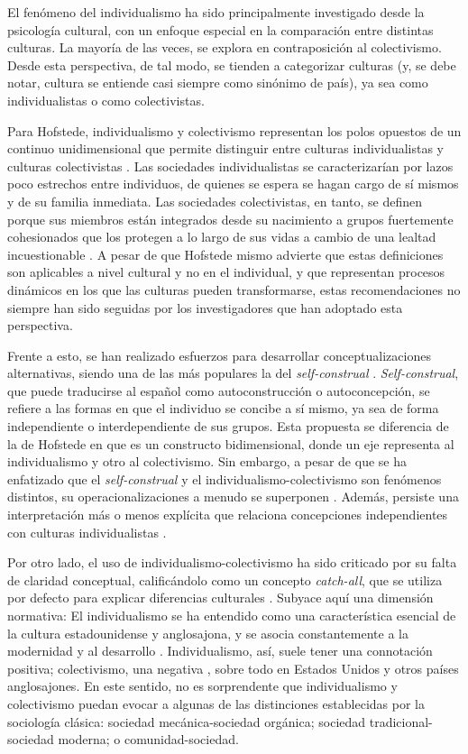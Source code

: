 \documentclass[12pt,twoside]{templates/facsothesis}
\begin{document}
El fenómeno del individualismo ha sido principalmente investigado desde la psicología cultural, con un enfoque especial en la comparación entre distintas culturas. La mayoría de las veces, se explora en contraposición al colectivismo. Desde esta perspectiva, de tal modo, se tienden a categorizar culturas (y, se debe notar, cultura se entiende casi siempre como sinónimo de país), ya sea como individualistas o como colectivistas.

Para Hofstede, individualismo y colectivismo representan los polos opuestos de un continuo unidimensional que permite distinguir entre culturas individualistas y culturas colectivistas \citep{yoon2010}. Las sociedades individualistas se caracterizarían por lazos poco estrechos entre individuos, de quienes se espera se hagan cargo de sí mismos y de su familia inmediata. Las sociedades colectivistas, en tanto, se definen porque sus miembros están integrados desde su nacimiento a grupos fuertemente cohesionados que los protegen a lo largo de sus vidas a cambio de una lealtad incuestionable \citep{yoon2010}. A pesar de que Hofstede mismo advierte que estas definiciones son aplicables a nivel cultural y no en el individual, y que representan procesos dinámicos en los que las culturas pueden transformarse, estas recomendaciones no siempre han sido seguidas por los investigadores que han adoptado esta perspectiva.

Frente a esto, se han realizado esfuerzos para desarrollar conceptualizaciones alternativas, siendo una de las más populares la del \emph{self-construal} \citep{cross2011}. \emph{Self-construal}, que puede traducirse al español como autoconstrucción o autoconcepción, se refiere a las formas en que el individuo se concibe a sí mismo, ya sea de forma independiente o interdependiente de sus grupos. Esta propuesta se diferencia de la de Hofstede en que es un constructo bidimensional, donde un eje representa al individualismo y otro al colectivismo. Sin embargo, a pesar de que se ha enfatizado que el \emph{self-construal} y el individualismo-colectivismo son fenómenos distintos, su operacionalizaciones a menudo se superponen \citep{cross2011}. Además, persiste una interpretación más o menos explícita que relaciona concepciones independientes con culturas individualistas \citep{cross2011, voronov2002}.

Por otro lado, el uso de individualismo-colectivismo ha sido criticado por su falta de claridad conceptual, calificándolo como un concepto \emph{catch-all}, que se utiliza por defecto para explicar diferencias culturales \citep{voronov2002}. Subyace aquí una dimensión normativa: El individualismo se ha entendido como una característica esencial de la cultura estadounidense y anglosajona, y se asocia constantemente a la modernidad y al desarrollo \citep{voronov2002, wang2010, martuccelli2010}. Individualismo, así, suele tener una connotación positiva; colectivismo, una negativa \citep{moemeka1998}, sobre todo en Estados Unidos y otros países anglosajones. En este sentido, no es sorprendente que individualismo y colectivismo puedan evocar a algunas de las distinciones establecidas por la sociología clásica: sociedad mecánica-sociedad orgánica; sociedad tradicional-sociedad moderna; o comunidad-sociedad.
\end{document}
